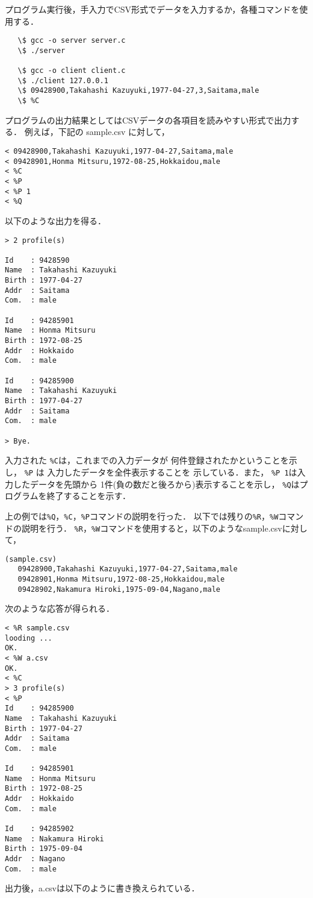 \documentclass[a4paper,11pt]{jarticle}
\begin{document}
プログラム実行後，手入力でCSV形式でデータを入力するか，各種コマンドを使用する．

{\fontsize{10pt}{11pt} \selectfont
 \begin{verbatim}
   \$ gcc -o server server.c
   \$ ./server

   \$ gcc -o client client.c
   \$ ./client 127.0.0.1
   \$ 09428900,Takahashi Kazuyuki,1977-04-27,3,Saitama,male
   \$ %C
 \end{verbatim}
}

プログラムの出力結果としてはCSVデータの各項目を読みやすい形式で出力する．
例えば，下記の sample.csv に対して，

{\fontsize{10pt}{11pt} \selectfont
 \begin{verbatim}
< 09428900,Takahashi Kazuyuki,1977-04-27,Saitama,male
< 09428901,Honma Mitsuru,1972-08-25,Hokkaidou,male
< %C
< %P
< %P 1
< %Q
 \end{verbatim}
}

\noindent 
以下のような出力を得る．

{\fontsize{10pt}{11pt} \selectfont
 \begin{verbatim}
> 2 profile(s)
   
Id    : 9428590
Name  : Takahashi Kazuyuki
Birth : 1977-04-27
Addr  : Saitama
Com.  : male

Id    : 94285901
Name  : Honma Mitsuru
Birth : 1972-08-25
Addr  : Hokkaido
Com.  : male
  
Id    : 94285900
Name  : Takahashi Kazuyuki
Birth : 1977-04-27
Addr  : Saitama
Com.  : male

> Bye.
 \end{verbatim}
}

\noindent
入力された
\verb|%C|は，これまでの入力データが
何件登録されたかということを示し，
\verb|%P| は 入力したデータを全件表示することを
示している．また，
\verb|%P 1|は入力したデータを先頭から
1件(負の数だと後ろから)表示することを示し，
\verb|%Q|はプログラムを終了することを示す．

上の例では\verb|%Q|，\verb|%C|，\verb|%P|コマンドの説明を行った．
以下では残りの\verb|%R|，\verb|%W|コマンドの説明を行う．
\verb|%R|，\verb|%W|コマンドを使用すると，以下のようなsample.csvに対して，

{\fontsize{10pt}{11pt} \selectfont
 \begin{verbatim}
(sample.csv)
   09428900,Takahashi Kazuyuki,1977-04-27,Saitama,male
   09428901,Honma Mitsuru,1972-08-25,Hokkaidou,male
   09428902,Nakamura Hiroki,1975-09-04,Nagano,male
  \end{verbatim}
}
\noindent
次のような応答が得られる．
{\fontsize{10pt}{11pt} \selectfont
 \begin{verbatim}
< %R sample.csv
looding ...
OK.
< %W a.csv
OK.
< %C
> 3 profile(s)
< %P
Id    : 94285900
Name  : Takahashi Kazuyuki
Birth : 1977-04-27
Addr  : Saitama
Com.  : male  

Id    : 94285901
Name  : Honma Mitsuru
Birth : 1972-08-25
Addr  : Hokkaido
Com.  : male

Id    : 94285902
Name  : Nakamura Hiroki
Birth : 1975-09-04
Addr  : Nagano
Com.  : male 
 \end{verbatim}
}
\noindent
出力後，a.csvは以下のように書き換えられている．
\end{document}
